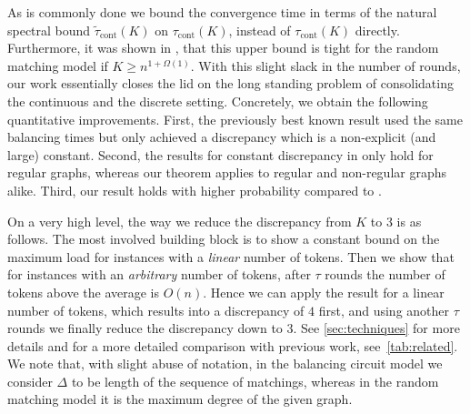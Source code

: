 \documentclass[twoside,leqno]{article}
\DeclareMathOperator{\1}{\mathbf{1}}
\newcommand{\taucont}[1]{{\tau}_{\mathrm{cont}}\left({#1}\right)}
\newcommand{\tauspectral}[1]{{\widetilde{\tau}}_{\mathrm{cont}}\left({#1}\right)}
\numberwithin{equation}{section}
\begin{document}
As is commonly done we bound the convergence time in terms of the natural spectral bound $\tauspectral{K}$ on $\taucont{K}$, instead of $\taucont{K}$ directly.
Furthermore, it was shown in \cite[Theorem~2.10]{DBLP:conf/focs/SauerwaldS12}, that this upper bound is tight for the random matching model if $K \geq n^{1+\Omega(1)}$. 
With this slight slack in the number of rounds, our work essentially closes the lid on the long standing problem of consolidating the continuous and the discrete setting. Concretely, we obtain the following quantitative improvements. First, the previously best known result \cite{DBLP:conf/focs/SauerwaldS12} used the same balancing times but only achieved a discrepancy which is a non-explicit (and large) constant.
Second, the results for constant discrepancy in \cite{DBLP:conf/focs/SauerwaldS12} only hold for regular graphs, whereas our theorem applies to regular and non-regular graphs alike.
Third, our result holds with higher probability compared to \cite{DBLP:conf/focs/SauerwaldS12}.

On a very high level, the way we reduce the discrepancy from $K$ to $3$ is as follows. The most involved building block is to show a constant bound on the maximum load for instances with a \emph{linear} number of tokens. Then we show that for instances with an \emph{arbitrary} number of tokens, after $\tau$ rounds the number of tokens above the average is $O(n)$. Hence we can apply the result for a linear number of tokens, which results into a discrepancy of $4$ first, and
using another $\tau$ rounds we finally reduce the discrepancy down to $3$. See \cref{sec:techniques} for more details and
for a more detailed comparison with previous work, see~\cref{tab:related}.
We note that, with slight abuse of notation, in the balancing circuit model we consider $\Delta$ to be length of the sequence of matchings, whereas in the random matching model it is the maximum degree of the given graph.

\newcommand{\rounddet}{det}
\newcommand{\roundrand}{rand}
\end{document}
